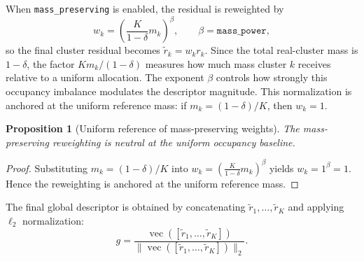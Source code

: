 \documentclass[journal]{IEEEtran}
\newtheorem{proposition}{Proposition}
\begin{document}
When \texttt{mass\_preserving} is enabled, the residual is reweighted by
\begin{equation}
w_k = \left(\frac{K}{1-\delta}m_k\right)^\beta,\qquad \beta = \texttt{mass\_power},
\end{equation}
so the final cluster residual becomes \(\tilde{r}_k = w_k r_k\). Since the total real-cluster mass is \(1-\delta\), the factor \(K m_k/(1-\delta)\) measures how much mass cluster \(k\) receives relative to a uniform allocation. The exponent \(\beta\) controls how strongly this occupancy imbalance modulates the descriptor magnitude. This normalization is anchored at the uniform reference mass: if \(m_k = (1-\delta)/K\), then \(w_k = 1\).

\begin{proposition}[Uniform reference of mass-preserving weights]
The mass-preserving reweighting is neutral at the uniform occupancy baseline.
\end{proposition}
\begin{proof}
Substituting \(m_k = (1-\delta)/K\) into \(w_k = \left(\frac{K}{1-\delta}m_k\right)^\beta\) yields \(w_k = 1^\beta = 1\). Hence the reweighting is anchored at the uniform reference mass.
\end{proof}

The final global descriptor is obtained by concatenating \(\tilde{r}_1,\ldots,\tilde{r}_K\) and applying \(\ell_2\) normalization:
\begin{equation}
g = \frac{\operatorname{vec}([\tilde{r}_1,\ldots,\tilde{r}_K])}{\|\operatorname{vec}([\tilde{r}_1,\ldots,\tilde{r}_K])\|_2}.
\end{equation}
\end{document}
